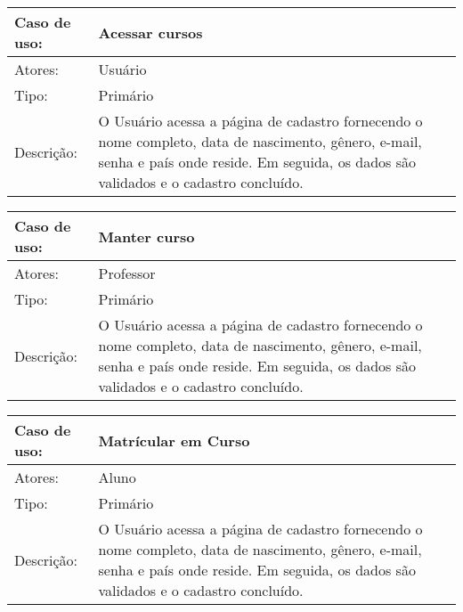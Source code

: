 \documentclass[12pt,a4paper,onecolumn,titlepage]{article}
\begin{document}
\newpage

\begin{table}[h!]
\begin{center}
\begin{tabular}{p{2.5cm} p{9.5cm}}
Caso de uso: & \textbf{Acessar cursos} \\ \hline
Atores: & Usuário \\ \hline
Tipo: & Primário \\ \hline
Descrição: & O Usuário acessa a página de cadastro fornecendo o nome completo, data de nascimento, gênero, e-mail, senha e país onde reside. Em seguida, os dados são validados e o cadastro concluído.
\end{tabular}
\end{center}
\end{table}

\newpage

\begin{table}[h!]
\begin{center}
\begin{tabular}{p{2.5cm} p{9.5cm}}
Caso de uso: & \textbf{Manter curso} \\ \hline
Atores: & Professor \\ \hline
Tipo: & Primário \\ \hline
Descrição: & O Usuário acessa a página de cadastro fornecendo o nome completo, data de nascimento, gênero, e-mail, senha e país onde reside. Em seguida, os dados são validados e o cadastro concluído.
\end{tabular}
\end{center}
\end{table}

\newpage

\begin{table}[h!]
\begin{center}
\begin{tabular}{p{2.5cm} p{9.5cm}}
Caso de uso: & \textbf{Matrícular em Curso} \\ \hline
Atores: & Aluno \\ \hline
Tipo: & Primário \\ \hline
Descrição: & O Usuário acessa a página de cadastro fornecendo o nome completo, data de nascimento, gênero, e-mail, senha e país onde reside. Em seguida, os dados são validados e o cadastro concluído.
\end{tabular}
\end{center}
\end{table}

\newpage
\end{document}
